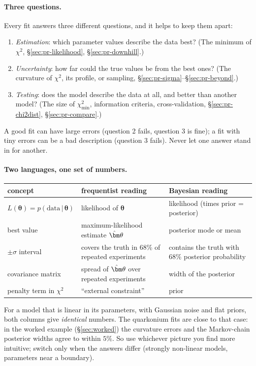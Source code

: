 \documentclass[11pt,a4paper]{article}
\numberwithin{equation}{section}
\theoremstyle{definition}
\theoremstyle{plain}
\theoremstyle{remark}
\numberwithin{algorithm}{section}
\newcommand{\vth}{\bm\theta}
\begin{document}
\paragraph{Three questions.} Every fit answers three different questions, and it helps to keep them apart:
\begin{enumerate}[leftmargin=1.5em,itemsep=2pt]
\item \emph{Estimation}: which parameter values describe the data best? (The minimum of $\chi^2$, \S\ref{sec:pr-likelihood}, \S\ref{sec:pr-downhill}.)
\item \emph{Uncertainty}: how far could the true values be from the best ones? (The curvature of $\chi^2$, its profile, or sampling, \S\ref{sec:pr-sigma}--\S\ref{sec:pr-beyond}.)
\item \emph{Testing}: does the model describe the data at all, and better than another model? (The size of $\chi^2_{\min}$, information criteria, cross-validation, \S\ref{sec:pr-chi2dist}, \S\ref{sec:pr-compare}.)
\end{enumerate}
A good fit can have large errors (question 2 fails, question 3 is fine); a fit with tiny errors can be a bad description (question 3 fails). Never let one answer stand in for another.

\paragraph{Two languages, one set of numbers.}
\begin{center}\small
\begin{tabular}{@{}p{4.9cm}p{4.9cm}p{4.9cm}@{}}\toprule
concept & frequentist reading & Bayesian reading\\\midrule
$L(\vth)=p(\text{data}\,|\,\vth)$ & likelihood of $\vth$ & likelihood (times prior = posterior)\\
best value & maximum-likelihood estimate $\hat\vth$ & posterior mode or mean\\
$\pm\sigma$ interval & covers the truth in 68\% of repeated experiments & contains the truth with 68\% posterior probability\\
covariance matrix & spread of $\hat\vth$ over repeated experiments & width of the posterior\\
penalty term in $\chi^2$ & ``external constraint'' & prior\\\bottomrule
\end{tabular}
\end{center}
For a model that is linear in its parameters, with Gaussian noise and flat priors, both columns give \emph{identical} numbers. The quarkonium fits are close to that case: in the worked example (\S\ref{sec:worked}) the curvature errors and the Markov-chain posterior widths agree to within $5\%$. So use whichever picture you find more intuitive; switch only when the answers differ (strongly non-linear models, parameters near a boundary).
\end{document}
